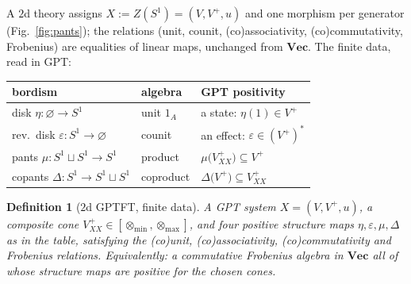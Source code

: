 \documentclass[prl,aps,10pt,superscriptaddress,floatfix]{revtex4-2}
\newtheorem*{defi}{Definition}
\begin{document}
A $2$d theory assigns $X:=Z(S^1)=(V,V^+,u)$ and one morphism per generator (Fig.~\ref{fig:pants}); the relations (unit, counit, (co)associativity, (co)commutativity, Frobenius) are equalities of linear maps, unchanged from $\mathbf{Vec}$. The finite data, read in GPT:

\begin{center}
\renewcommand{\arraystretch}{1.5}
\begin{tabular}{lll}
bordism & algebra & GPT positivity\\
\hline
disk $\eta:\varnothing\to S^1$ & unit $1_A$ & a state: $\eta(1)\in V^+$\\
rev.\ disk $\varepsilon:S^1\to\varnothing$ & counit & an effect: $\varepsilon\in(V^+)^*$\\
pants $\mu:S^1\sqcup S^1\to S^1$ & product & $\mu\big(V^+_{XX}\big)\subseteq V^+$\\
copants $\Delta:S^1\to S^1\sqcup S^1$ & coproduct & $\Delta\big(V^+\big)\subseteq V^+_{XX}$
\end{tabular}
\end{center}

\begin{defi}[$2$d GPTFT, finite data]
A GPT system $X=(V,V^+,u)$, a composite cone $V^+_{XX}\in[\otimes_{\min},\otimes_{\max}]$, and four \emph{positive} structure maps $\eta,\varepsilon,\mu,\Delta$ as in the table, satisfying the (co)unit, (co)associativity, (co)commutativity and Frobenius relations. Equivalently: a commutative Frobenius algebra in $\mathbf{Vec}$ all of whose structure maps are positive for the chosen cones.
\end{defi}
\end{document}
